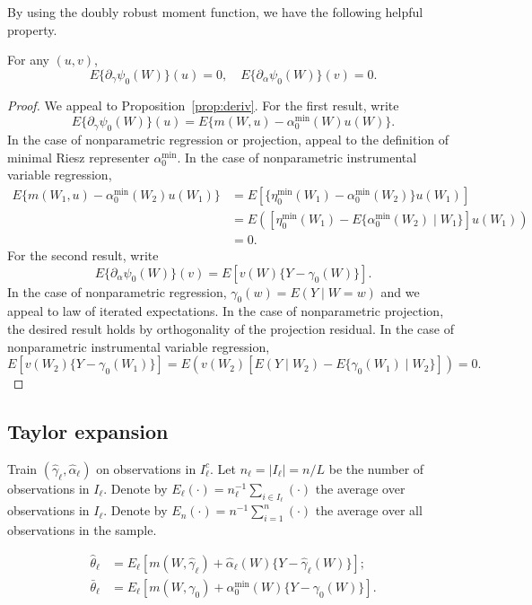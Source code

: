 By using the doubly robust moment function, we have the following helpful property.
\begin{proposition}\label{prop:mean_zero}
For any $(u,v)$,
$$
E\{\partial_{\gamma} \psi_0(W)\}(u)=0,\quad E\{\partial_{\alpha} \psi_0(W)\}(v)=0.
$$
\end{proposition}

\begin{proof}
We appeal to Proposition~\ref{prop:deriv}. For the first result, write
$$
E\{\partial_{\gamma} \psi_0(W)\}(u)=E\{m(W,u)-\alpha_0^{\min}(W)u(W)\}.
$$
In the case of nonparametric regression or projection, appeal to the definition of minimal Riesz representer $\alpha_0^{\min}$. In the case of nonparametric instrumental variable regression,
\begin{align*}
    E\{m(W_1,u)-\alpha_0^{\min}(W_2)u(W_1)\}
    &=E[\{\eta_0^{\min}(W_1)-\alpha_0^{\min}(W_2)\}u(W_1)] \\
    &=E([\eta_0^{\min}(W_1)-E\{\alpha_0^{\min}(W_2) \mid W_1\}]u(W_1)) \\
    &=0.
\end{align*}
For the second result, write
$$
E\{\partial_{\alpha} \psi_0(W)\}(v)=E[v(W)\{Y-\gamma_0(W)\}].
$$
In the case of nonparametric regression, $\gamma_0(w)=E(Y\mid W=w)$ and we appeal to law of iterated expectations. In the case of nonparametric projection, the desired result holds by orthogonality of the projection residual. In the case of nonparametric instrumental variable regression,
$$
E[v(W_2)\{Y-\gamma_0(W_1)\}]=E(v(W_2)[E(Y \mid W_2)-E\{\gamma_0(W_1) \mid W_2\}])=0.
$$
\end{proof}

\subsection{Taylor expansion}

Train $(\hat{\gamma}_{\ell},\hat{\alpha}_{\ell})$ on observations in $I_{\ell}^c$. Let $n_{\ell}=|I_{\ell}|=n/L$ be the number of observations in $I_{\ell}$. Denote by $E_{\ell}(\cdot)=n_{\ell}^{-1}\sum_{i\in I_{\ell}}(\cdot)$ the average over observations in $I_{\ell}$. Denote by $E_n(\cdot)=n^{-1}\sum_{i=1}^n(\cdot)$ the average over all observations in the sample.

\begin{definition}
\begin{align*}
 \hat{\theta}_{\ell}&=E_{\ell} [m(W,\hat{\gamma}_{\ell})+\hat{\alpha}_{\ell}(W)\{Y-\hat{\gamma}_{\ell}(W)\}];\\
    \bar{\theta}_{\ell}&=E_{\ell} [m(W,\gamma_0)+\alpha_0^{\min}(W)\{Y-\gamma_0(W)\}].
\end{align*}
\end{definition}

